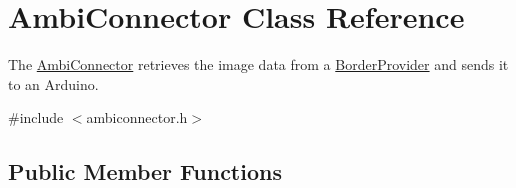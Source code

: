 \hypertarget{classAmbiConnector}{}\section{Ambi\+Connector Class Reference}
\label{classAmbiConnector}


The \hyperlink{classAmbiConnector}{Ambi\+Connector} retrieves the image data from a \hyperlink{classBorderProvider}{Border\+Provider} and sends it to an Arduino.  




{\ttfamily \#include $<$ambiconnector.\+h$>$}

\subsection*{Public Member Functions}
